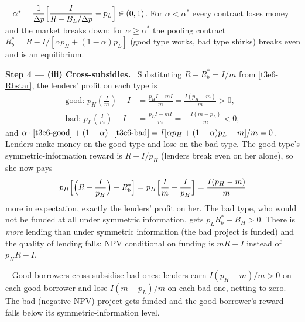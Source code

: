 \documentclass[11pt,a4paper]{article}
\newcommand{\step}[2]{\par\medskip\noindent\textbf{Step #1 --- #2.}~}
\newcommand{\answer}[1]{\par\smallskip\noindent\fbox{\textbf{Answer #1.}}~}
\begin{document}
\answer{(ii)} $\alpha^*=\dfrac{1}{\Delta p}\Bigl[\dfrac{I}{R-B_L/\Delta p}-p_L\Bigr]\in(0,1)$. For $\alpha<\alpha^*$ every contract loses money and the market breaks down; for $\alpha\ge\alpha^*$ the pooling contract $R_b^*=R-I/[\alpha p_H+(1-\alpha)p_L]$ (good type works, bad type shirks) breaks even and is an equilibrium.

\step{4}{(iii) Cross-subsidies} Substituting $R-R_b^*=I/m$ from \eqref{t3e6-Rbstar}, the lenders' profit on each type is
\begin{align}
  \text{good: } p_H\left(\frac{I}{m}\right)-I &= \frac{p_HI-mI}{m} = \frac{I(p_H-m)}{m} > 0, \label{t3e6-good}\\
  \text{bad: } p_L\left(\frac{I}{m}\right)-I &= \frac{p_LI-mI}{m} = -\frac{I(m-p_L)}{m} < 0, \label{t3e6-bad}
\end{align}
and $\alpha\cdot\eqref{t3e6-good}+(1-\alpha)\cdot\eqref{t3e6-bad}=I[\alpha p_H+(1-\alpha)p_L-m]/m=0$. Lenders make money on the good type and lose on the bad type. The good type's symmetric-information reward is $R-I/p_H$ (lenders break even on her alone), so she now pays
\begin{align}
  p_H\Bigl[\Bigl(R-\frac{I}{p_H}\Bigr)-R_b^*\Bigr] = p_H\Bigl[\frac{I}{m}-\frac{I}{p_H}\Bigr] = \frac{I(p_H-m)}{m} \nonumber
\end{align}
more in expectation, exactly the lenders' profit on her. The bad type, who would not be funded at all under symmetric information, gets $p_LR_b^*+B_H>0$. There is \emph{more} lending than under symmetric information (the bad project is funded) and the quality of lending falls: NPV conditional on funding is $mR-I$ instead of $p_HR-I$.

\answer{(iii)} Good borrowers cross-subsidise bad ones: lenders earn $I(p_H-m)/m>0$ on each good borrower and lose $I(m-p_L)/m$ on each bad one, netting to zero. The bad (negative-NPV) project gets funded and the good borrower's reward falls below its symmetric-information level.
\end{document}
